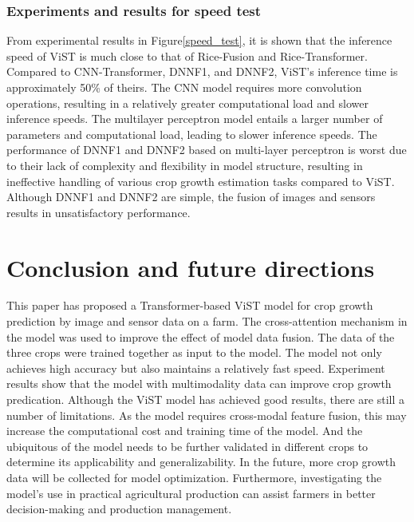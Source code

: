 \documentclass[acmsmall,manuscript, screen, review]{acmart}
\begin{document}
\subsubsection{Experiments and results for speed test}



 From experimental results in Figure\ref{speed_test}, it is shown that the inference speed of ViST is much close to that of Rice-Fusion and Rice-Transformer. Compared to CNN-Transformer, DNNF1, and DNNF2, ViST's inference time is approximately 50\% of theirs. The CNN model requires more convolution operations, resulting in a relatively greater computational load and slower inference speeds. The multilayer perceptron model entails a larger number of parameters and computational load, leading to slower inference speeds. The performance of DNNF1 and DNNF2 based on multi-layer perceptron is worst due to their lack of complexity and flexibility in model structure, resulting in ineffective handling of various crop growth estimation tasks compared to ViST. Although DNNF1 and DNNF2 are simple, the fusion of images and sensors results in unsatisfactory performance.

\section{Conclusion and future directions}

This paper has proposed a Transformer-based ViST model for crop growth prediction by image and sensor data on a farm. The cross-attention mechanism in the model was used to improve the effect of model data fusion. The data of the three crops were trained together as input to the model. The model not only achieves high accuracy but also maintains a relatively fast speed. Experiment results show that the model with multimodality data can improve crop growth predication. Although the ViST model has achieved good results, there are still a number of limitations. As the model requires cross-modal feature fusion, this may increase the computational cost and training time of the model. And the ubiquitous of the model needs to be further validated in different crops to determine its applicability and generalizability. In the future, more crop growth data will be collected for model optimization. Furthermore, investigating the model's use in practical agricultural production can assist farmers in better decision-making and production management.
\end{document}
